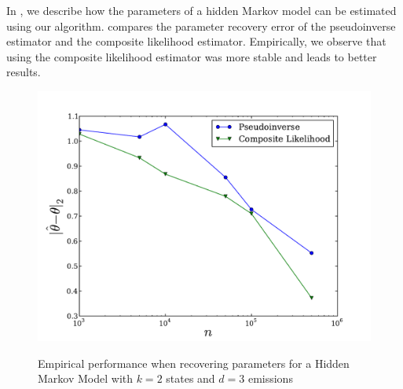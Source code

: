 In , we describe how the parameters of a hidden Markov
  model can be estimated using our algorithm. 
 compares the parameter recovery error of the
  pseudoinverse estimator and the composite likelihood estimator.
Empirically, we observe that using the composite likelihood estimator
  was more stable and leads to better results.


\begin{figure}
  \centering
  \includegraphics[width=\columnwidth]{figures/hmm-2-3.pdf}
    \label{fig:cl-hmm}
  \caption{Empirical performance when recovering parameters for a Hidden Markov Model with $k=2$ states and $d=3$ emissions}
\end{figure}

